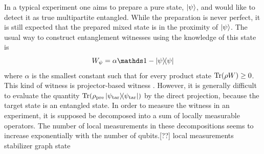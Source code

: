 \documentclass[
reprint,
aps,
pra,
floatfix,
]{revtex4-2}
\theoremstyle{plain}
\newtheorem{proposition}{Proposition}
\theoremstyle{definition}
\newtheorem{remark}{Remark}
\newcommand{\ew}{W}
\newcommand{\dm}{\rho}
\newcommand{\target}{\textup{tar}}
\newcommand{\prepare}{\textup{pre}}
\begin{document}
In a typical experiment one aims to prepare a pure state, $\ket{\psi}$, and would like to detect it as true multipartite entangled. 
While the preparation is never perfect, it is still expected that the prepared mixed state is in the proximity of $\ket{\psi}$. The usual way to construct entanglement witnesses using the knowledge of this state is
\begin{equation}
	\ew_{\psi} = \alpha\identity - \op{\psi} 
	\label{eq:entanglement_witness}
\end{equation}
where $\alpha$ is the smallest constant such that for every product state $\Tr(\dm\ew)\ge 0$.
This kind of witness is projector-based witness \cite{bourennaneWitnessingMultipartiteEntanglement2004}.
However, it is generally difficult to evaluate the quantity $\Tr(\dm_{\prepare} \op{\psi_{\target}})$ by the direct projection, because the target state is an entangled state.
In order to measure the witness in an experiment, it is supposed be decomposed into a sum of locally measurable operators. 
The number of local measurements in these decompositions seems to increase exponentially with the number of qubits.[??]
local measurements \cite{tothDetectingGenuineMultipartite2005}
stabilizer \cite{tothEntanglementDetectionStabilizer2005}
graph state \cite{zhouDetectingMultipartiteEntanglement2019}
\end{document}
